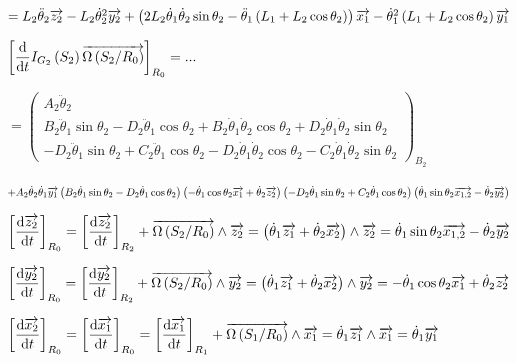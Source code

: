 \documentclass[10pt,fleqn]{article} %
\begin{document}
\begin{multicols}{2}
\begin{corrige}
$=L_2 \ddot{\theta}_2 \vect{z_2}-L_2 \dot{\theta}_2^2 \vect{y_2} 
+\left(2L_2 \dot{\theta}_1 \dot{\theta}_2 \sin\theta_2 %
-\ddot{\theta}_1\left (L_1+L_2 \cos\theta_2 \right)\right)\vect{x_1}
-\dot{\theta}_1^2\left (L_1+L_2 \cos\theta_2 \right)\vect{y_1}$


$\left[\dfrac{\text{d}}{\text{d} t}I_{G_2}\left( S_2\right)\overrightarrow{\Omega\left( {S_2}/{R_0}\right)}\right]_{R_0}=...$

$=
\begin{pmatrix}
A_2\ddot{\theta}_2 \\
B_2\ddot{\theta}_1\sin\theta_2 - D_2 \ddot{\theta}_1\cos\theta_2
+B_2\dot{\theta}_1\dot{\theta}_2\cos\theta_2 + D_2 \dot{\theta}_1\dot{\theta}_2\sin\theta_2\\
-D_2\ddot{\theta}_1\sin\theta_2 +C_2 \ddot{\theta}_1\cos\theta_2-D_2\dot{\theta}_1\dot{\theta}_2\cos\theta_2 -C_2 \dot{\theta}_1\dot{\theta}_2\sin\theta_2
\end{pmatrix}_{B_2}
$

$
+
A_2\dot{\theta}_2 \dot{\theta}_1 \overrightarrow{y_1}
\left(B_2\dot{\theta}_1\sin\theta_2 - D_2 \dot{\theta}_1\cos\theta_2\right)\left( -\dot{\theta}_1 \cos\theta_2\overrightarrow{x_1}+\dot{\theta}_2 \overrightarrow{z_2}\right)
\left(-D_2\dot{\theta}_1\sin\theta_2 +C_2 \dot{\theta}_1\cos\theta_2\right) \left( \dot{\theta}_1 \sin\theta_2 \overrightarrow{x_{1,2}} -\dot{\theta}_2 \overrightarrow{y_2} \right)
$



$\left[\dfrac{\text{d} \overrightarrow{z_2}}{\text{d} t}\right]_{R_0}
=\left[\dfrac{\text{d} \overrightarrow{z_2}}{\text{d} t}\right]_{R_2} + \overrightarrow{\Omega\left( {S_2}/{R_0}\right)}\wedge\overrightarrow{z_2}
= \left( \dot{\theta}_1 \overrightarrow{z_1}+\dot{\theta}_2 \overrightarrow{x_2}\right) \wedge \overrightarrow{z_2}
= \dot{\theta}_1 \sin\theta_2 \overrightarrow{x_{1,2}} -\dot{\theta}_2 \overrightarrow{y_2} 
$


$\left[\dfrac{\text{d} \overrightarrow{y_2}}{\text{d} t}\right]_{R_0}
=\left[\dfrac{\text{d} \overrightarrow{y_2}}{\text{d} t}\right]_{R_2} + \overrightarrow{\Omega\left( {S_2}/{R_0}\right)}\wedge\overrightarrow{y_2}
= \left( \dot{\theta}_1 \overrightarrow{z_1}+\dot{\theta}_2 \overrightarrow{x_2}\right) \wedge \overrightarrow{y_2}
= -\dot{\theta}_1 \cos\theta_2\overrightarrow{x_1}+\dot{\theta}_2 \overrightarrow{z_2}
$


$\left[\dfrac{\text{d} \overrightarrow{x_2}}{\text{d} t}\right]_{R_0}
=\left[\dfrac{\text{d} \overrightarrow{x_1}}{\text{d} t}\right]_{R_0}
=\left[\dfrac{\text{d} \overrightarrow{x_1}}{\text{d} t}\right]_{R_1} + \overrightarrow{\Omega\left( {S_1}/{R_0}\right)}\wedge\overrightarrow{x_1}
=\dot{\theta}_1 \overrightarrow{z_1} \wedge  \overrightarrow{x_1}
=\dot{\theta}_1 \overrightarrow{y_1}$





\end{corrige}
\end{multicols}
\end{document}
